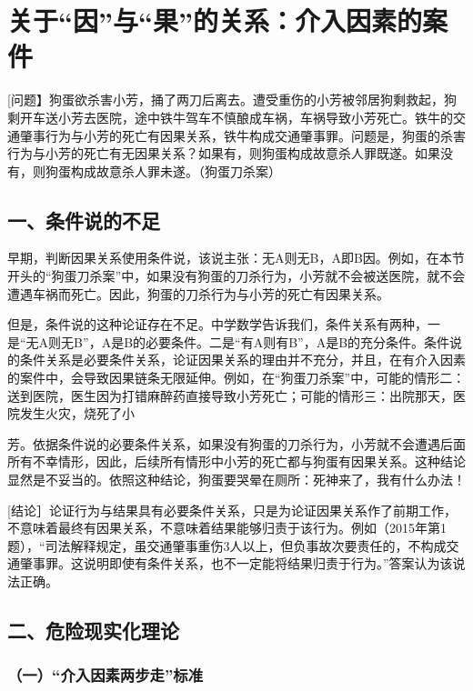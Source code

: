 \section{关于“因”与“果”的关系：介入因素的案件}

[问题】狗蛋欲杀害小芳，捅了两刀后离去。遭受重伤的小芳被邻居狗剩救起，狗剩开车送小芳去医院，途中铁牛驾车不慎酿成车祸，车祸导致小芳死亡。铁牛的交通肇事行为与小芳的死亡有因果关系，铁牛构成交通肇事罪。问题是，狗蛋的杀害行为与小芳的死亡有无因果关系？如果有，则狗蛋构成故意杀人罪既遂。如果没有，则狗蛋构成故意杀人罪未遂。（狗蛋刀杀案）

\subsection*{一、条件说的不足}

早期，判断因果关系使用条件说，该说主张：无A则无B，A即B因。例如，在本节开头的“狗蛋刀杀案”中，如果没有狗蛋的刀杀行为，小芳就不会被送医院，就不会遭遇车祸而死亡。因此，狗蛋的刀杀行为与小芳的死亡有因果关系。

但是，条件说的这种论证存在不足。中学数学告诉我们，条件关系有两种，一是“无A则无B”，A是B的必要条件。二是“有A则有B”，A是B的充分条件。条件说的条件关系是必要条件关系，论证因果关系的理由并不充分，并且，在有介入因素的案件中，会导致因果链条无限延伸。例如，在“狗蛋刀杀案”中，可能的情形二：送到医院，医生因为打错麻醉药直接导致小芳死亡；可能的情形三：出院那天，医院发生火灾，烧死了小

芳。依据条件说的必要条件关系，如果没有狗蛋的刀杀行为，小芳就不会遭遇后面所有不幸情形，因此，后续所有情形中小芳的死亡都与狗蛋有因果关系。这种结论显然是不妥当的。依照这种结论，狗蛋要哭晕在厕所：死神来了，我有什么办法！

[结论］论证行为与结果具有必要条件关系，只是为论证因果关系作了前期工作，不意味着最终有因果关系，不意味着结果能够归责于该行为。例如（2015年第1题），“司法解释规定，虽交通肇事重伤3人以上，但负事故次要责任的，不构成交通肇事罪。这说明即使有条件关系，也不一定能将结果归责于行为。”答案认为该说法正确。

\subsection*{二、危险现实化理论\protect\footnotemark}

\subsubsection*{（一）“介入因素两步走”标准}

